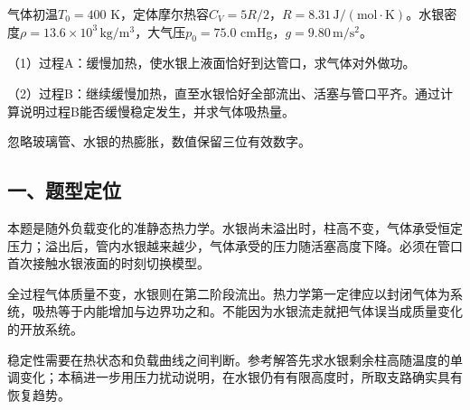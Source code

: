 \documentclass[12pt,a4paper,fontset=fandol]{ctexart}
\begin{document}
气体初温\(T_0=400\)
K，定体摩尔热容\(C_V=5R/2\)，\(R=8.31\,\mathrm{J/(mol\cdot K)}\)。水银密度\(\rho=13.6\times10^3\,\mathrm{kg/m^3}\)，大气压\(p_0=75.0\)
cmHg，\(g=9.80\,\mathrm{m/s^2}\)。

\begin{center}
\begin{minipage}{\linewidth}
\centering\begingroup{}
\ifdim\wd\diagrambox>.88\linewidth
\sbox{\diagrambox}{\resizebox{.88\linewidth}{!}{\usebox{\diagrambox}}}\fi
\ifdim\ht\diagrambox>.38\textheight
\resizebox{!}{.38\textheight}{\usebox{\diagrambox}}
\else\usebox{\diagrambox}\fi
\par{}\endgroup\end{minipage}\end{center}

（1）过程A：缓慢加热，使水银上液面恰好到达管口，求气体对外做功。

（2）过程B：继续缓慢加热，直至水银恰好全部流出、活塞与管口平齐。通过计算说明过程B能否缓慢稳定发生，并求气体吸热量。

忽略玻璃管、水银的热膨胀，数值保留三位有效数字。

\subsection{一、题型定位}\label{ux4e00ux9898ux578bux5b9aux4f4d-1}

本题是随外负载变化的准静态热力学。水银尚未溢出时，柱高不变，气体承受恒定压力；溢出后，管内水银越来越少，气体承受的压力随活塞高度下降。必须在管口首次接触水银液面的时刻切换模型。

全过程气体质量不变，水银则在第二阶段流出。热力学第一定律应以封闭气体为系统，吸热等于内能增加与边界功之和。不能因为水银流走就把气体误当成质量变化的开放系统。

稳定性需要在热状态和负载曲线之间判断。参考解答先求水银剩余柱高随温度的单调变化；本稿进一步用压力扰动说明，在水银仍有有限高度时，所取支路确实具有恢复趋势。
\end{document}
